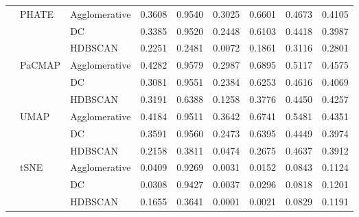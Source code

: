 \begin{tabular}{lllrrrrrr}
\cline{2-9}
 & \multirow[t]{3}{*}{PHATE} & Agglomerative & 0.3608 & 0.9540 & 0.3025 & 0.6601 & 0.4673 & 0.4105 \\
 &  & DC & 0.3385 & 0.9520 & 0.2448 & 0.6103 & 0.4418 & 0.3987 \\
 &  & HDBSCAN & 0.2251 & 0.2481 & 0.0072 & 0.1861 & 0.3116 & 0.2801 \\
\cline{2-9}
 & \multirow[t]{3}{*}{PaCMAP} & Agglomerative & 0.4282 & 0.9579 & 0.2987 & 0.6895 & 0.5117 & 0.4575 \\
 &  & DC & 0.3081 & 0.9551 & 0.2384 & 0.6253 & 0.4616 & 0.4069 \\
 &  & HDBSCAN & 0.3191 & 0.6388 & 0.1258 & 0.3776 & 0.4450 & 0.4257 \\
\cline{2-9}
 & \multirow[t]{3}{*}{UMAP} & Agglomerative & 0.4184 & 0.9511 & 0.3642 & 0.6741 & 0.5481 & 0.4351 \\
 &  & DC & 0.3591 & 0.9560 & 0.2473 & 0.6395 & 0.4449 & 0.3974 \\
 &  & HDBSCAN & 0.2158 & 0.3811 & 0.0474 & 0.2675 & 0.4637 & 0.3912 \\
\cline{2-9}
 & \multirow[t]{3}{*}{tSNE} & Agglomerative & 0.0409 & 0.9269 & 0.0031 & 0.0152 & 0.0843 & 0.1124 \\
 &  & DC & 0.0308 & 0.9427 & 0.0037 & 0.0296 & 0.0818 & 0.1201 \\
 &  & HDBSCAN & 0.1655 & 0.3641 & 0.0001 & 0.0021 & 0.0829 & 0.1191 \\
\cline{1-9} \cline{2-9}
\bottomrule
\end{tabular}
